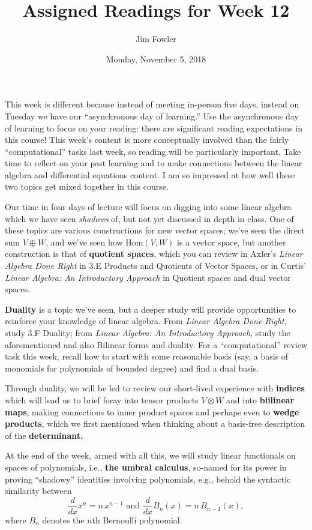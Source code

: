\documentclass{homework}
\author{Jim Fowler}
\title{Assigned Readings for Week 12}
\date{Monday, November 5, 2018}
\begin{document}
\maketitle

This week is different because instead of meeting in-person five days,
instead on Tuesday we have our ``asynchronous day of learning.'' Use
the asynchronous day of learning to focus on your reading: there are
significant reading expectations in this course! This week's content
is more conceptually involved than the fairly ``computational'' tasks
last week, so reading will be particularly important. Take time to
reflect on your past learning and to make connections between the
linear algebra and differential equations content. I am so impressed
at how well these two topics get mixed together in this course.

Our time in four days of lecture will focus on digging into some
linear algebra which we have seen \textit{shadows} of, but not yet discussed in
depth in class.  One of these topics are various constructions for new
vector spaces; we've seen the direct sum $V \oplus W$, and we've seen
how $\mathrm{Hom}(V,W)$ is a vector space, but another construction is
that of \textbf{quotient spaces}, which you can review in Axler's
\textit{Linear Algebra Done Right} in \textsection 3.E Products and
Quotients of Vector Spaces, or in Curtis' \textit{Linear Algebra: An
  Introductory Approach} in  Quotient spaces and dual
vector spaces.

\textbf{Duality} is a topic we've seen, but a deeper study will
provide opportunities to reinforce your knowledge of linear algebra.
From \textit{Linear Algebra Done Right}, study \textsection 3.F
Duality; from \textit{Linear Algebra: An Introductory Approach}, study
the aforementioned  and also  Bilinear
forms and duality.  For a ``computational'' review task this week,
recall how to start with some reasonable basis (say, a basis of
monomials for polynomials of bounded degree) and find a dual basis.

Through duality, we will be led to review our short-lived experience
with \textbf{indices} which will lead us to brief foray into tensor
products $V \otimes W$ and into \textbf{biilinear maps}, making
connections to inner product spaces and perhaps even to \textbf{wedge
  products}, which we first mentioned when thinking about a basis-free
description of the \textbf{determinant.}

At the end of the week, armed with all this, we will study linear
functionals on spaces of polynomials, i.e., \textbf{the umbral
  calculus}, so-named for its power in proving ``shadowy'' identities
involving polynomials, e.g., behold the syntactic similarity between
\[
 \frac {d}{dx} x^{n}=n\,x^{n-1} \mbox{ and } {\frac {d}{dx}}B_{n}(x)=n \, B_{n-1}(x),
\]
where $B_n$ denotes the $n$th Bernoulli polynomial.
\end{document}
